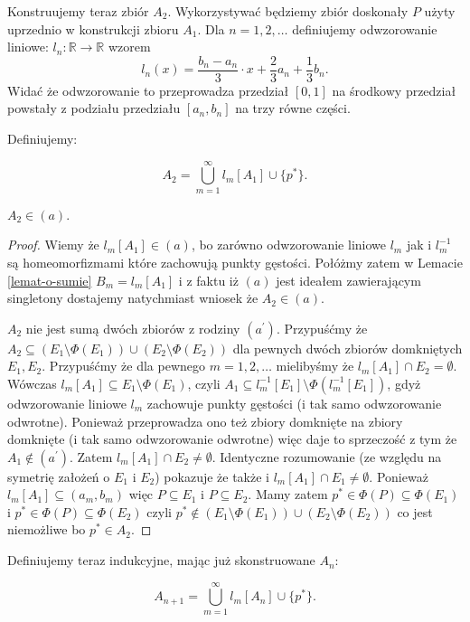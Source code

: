 \documentclass[12pt]{amsart}
\theoremstyle{plain}
\theoremstyle{definition}
\theoremstyle{remark}
\newcommand{\real}{\mathbb{R}}
\newcommand{\aideal}{\mathit{(a)}}
\newcommand{\aidealprime}{\mathit{(a^\prime)}}
\begin{document}
Konstruujemy teraz zbiór $A_2$.
Wykorzystywać będziemy zbiór doskonały $P$
użyty uprzednio w konstrukcji zbioru $A_1$.
Dla $n = 1,2,\ldots$ definiujemy odwzorowanie liniowe:
$l_n\colon \real\to\real$ wzorem
\[l_n(x) = \frac{b_n - a_n}{3} \cdot x + \frac{2}{3} a_n + \frac{1}{3} b_n.\]
Widać że odwzorowanie to przeprowadza przedział $[0,1]$ na
środkowy przedział powstały z podziału przedziału $[a_n, b_n]$ na trzy
równe części.

\smallskip

Definiujemy:

\[ A_2 = \bigcup_{m=1}^{\infty} l_m[A_1] \cup \lbrace p^* \rbrace.
\]


 $A_2 \in \aideal$.
\begin{proof}
Wiemy że $l_m[A_1] \in \aideal$, bo zarówno odwzorowanie liniowe $l_m$
jak i $l_m^{-1}$ są homeomorfizmami które zachowują punkty gęstości.
Połóżmy zatem w Lemacie \ref{lemat-o-sumie} 
$B_m = l_m[A_1]$ i z faktu iż $\aideal$ jest ideałem
zawierającym singletony dostajemy natychmiast wniosek
że $A_2 \in \aideal$.

 $A_2$ nie jest sumą dwóch zbiorów z rodziny $\aidealprime$.
Przypuśćmy że $A_2 \subseteq (E_1 \setminus \Phi(E_1)) \cup (E_2 \setminus \Phi(E_2))$
dla pewnych dwóch zbiorów domkniętych $E_1, E_2$.  Przypuśćmy że dla pewnego 
$m = 1,2,\ldots$ mielibyśmy że $l_m[A_1] \cap E_2 = \emptyset$.
Wówczas $l_m[A_1] \subseteq E_1 \setminus \Phi(E_1)$, czyli 
$A_1 \subseteq l_m^{-1}[E_1] \setminus \Phi(l_m^{-1}[E_1])$, gdyż
odwzorowanie liniowe $l_m$ zachowuje punkty gęstości (i tak samo odwzorowanie odwrotne). Ponieważ 
przeprowadza ono też zbiory domknięte na zbiory domknięte (i tak samo odwzorowanie odwrotne)
więc daje to sprzeczość z tym że $A_1 \not\in \aidealprime$.
Zatem $l_m[A_1] \cap E_2 \not= \emptyset$.
Identyczne rozumowanie (ze względu na symetrię założeń o $E_1$ i $E_2$)
pokazuje że także i $l_m[A_1] \cap E_1 \not= \emptyset$.
Ponieważ $l_m[A_1] \subseteq (a_m, b_m)$
więc $P \subseteq E_1$ i $P \subseteq E_2$. 
Mamy zatem $p^* \in \Phi(P) \subseteq \Phi(E_1)$
i $p^* \in \Phi(P) \subseteq \Phi(E_2)$
czyli $p^* \not\in (E_1 \setminus \Phi(E_1)) \cup (E_2 \setminus \Phi(E_2))$
co jest niemożliwe bo $p^* \in A_2$.
\end{proof}

Definiujemy teraz indukcyjne, mając już skonstruowane $A_n$:

\[ A_{n + 1} = \bigcup_{m=1}^{\infty} l_m[A_n] \cup \lbrace p^* \rbrace.
\]
\end{document}
